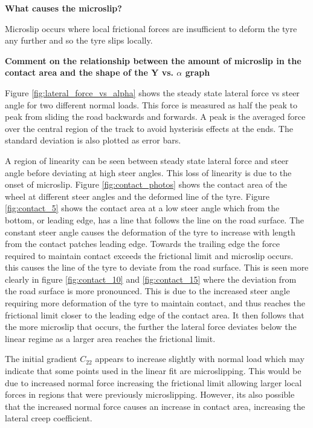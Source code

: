 \documentclass{article}
\begin{document}
\begin{center}
    \textbf{What causes the microslip?}
\end{center}
Microslip occurs where local frictional forces are insufficient to deform the tyre any further and so the tyre slips locally.

\begin{center}
    \textbf{Comment on the relationship between the amount of microslip in the contact area and
    the shape of the Y vs. $ \alpha $ graph}
\end{center}

Figure \ref{fig:lateral_force_vs_alpha} shows the steady state lateral force vs steer angle for two different normal loads.
This force is measured as half the peak to peak from sliding the road backwards and forwards.
A peak is the averaged force over the central region of the track to avoid hysterisis effects at the ends. The standard deviation is also plotted as error bars.

A region of linearity can be seen between steady state lateral force and steer angle before deviating at high steer angles.
This loss of linearity is due to the onset of microslip.
Figure \ref{fig:contact_photos} shows the contact area of the wheel at different steer angles and the deformed line of the tyre. %
Figure \ref{fig:contact_5} shows the contact area at a low steer angle which from the bottom, or leading edge, has a line that follows the line on the road surface.
The constant steer angle causes the deformation of the tyre to increase with length from the contact patches leading edge.
Towards the trailing edge the force required to maintain contact exceeds the frictional limit and microslip occurs.
this causes the line of the tyre to deviate from the road surface.
This is seen more clearly in figure \ref{fig:contact_10} and \ref{fig:contact_15} where the deviation from the road surface is more pronounced.
This is due to the increased steer angle requiring more deformation of the tyre to maintain contact, and thus reaches the frictional limit closer to the leading edge of the contact area.
It then follows that the more microslip that occurs, the further the lateral force deviates below the linear regime as a larger area reaches the frictional limit.

The initial gradient $C_{22}$ appears to increase slightly with normal load which may indicate that some points used in the linear fit are microslipping.
This would be due to increased normal force increasing the frictional limit allowing larger local forces in regions that were previously microslipping.
However, its also possible that the increased normal force causes an increase in contact area, increasing the lateral creep coefficient.
\end{document}
